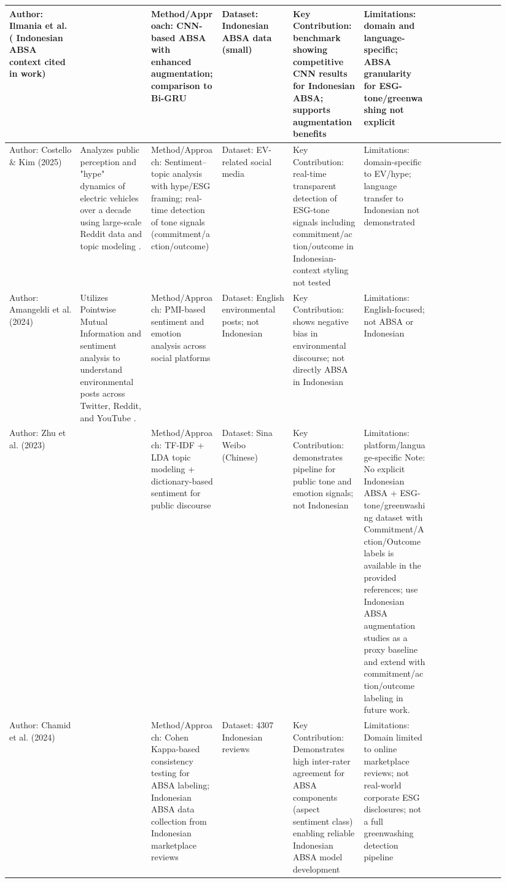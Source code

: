 \documentclass{article}
\begin{document}
\begin{landscape}
\begin{longtable}{p{0.134\linewidth} p{0.134\linewidth} p{0.134\linewidth} p{0.134\linewidth} p{0.134\linewidth} p{0.134\linewidth} p{0.134\linewidth}}
Author: Ilmania et al. ( Indonesian ABSA context cited in work) & ~ & Method/Approach: CNN-based ABSA with enhanced augmentation; comparison to Bi-GRU & Dataset: Indonesian ABSA data (small) & Key Contribution: benchmark showing competitive CNN results for Indonesian ABSA; supports augmentation benefits & Limitations: domain and language-specific; ABSA granularity for ESG-tone/greenwashing not explicit & ~ \\ \hline
Author: Costello \& Kim (2025) & Analyzes public perception and "hype" dynamics of electric vehicles over a decade using large-scale Reddit data and topic modeling  \parencite{tao_ruan_824a9480}. & Method/Approach: Sentiment–topic analysis with hype/ESG framing; real-time detection of tone signals (commitment/action/outcome) & Dataset: EV-related social media & Key Contribution: real-time transparent detection of ESG-tone signals including commitment/action/outcome in Indonesian-context styling not tested & Limitations: domain-specific to EV/hype; language transfer to Indonesian not demonstrated & ~ \\ \hline
Author: Amangeldi et al. (2024) & Utilizes Pointwise Mutual Information and sentiment analysis to understand environmental posts across Twitter, Reddit, and YouTube  \parencite{daniyar_amangeldi_dfc2f315}. & Method/Approach: PMI-based sentiment and emotion analysis across social platforms & Dataset: English environmental posts; not Indonesian & Key Contribution: shows negative bias in environmental discourse; not directly ABSA in Indonesian & Limitations: English-focused; not ABSA or Indonesian & ~ \\ \hline
Author: Zhu et al. (2023) & ~ & Method/Approach: TF-IDF + LDA topic modeling + dictionary-based sentiment for public discourse & Dataset: Sina Weibo (Chinese) & Key Contribution: demonstrates pipeline for public tone and emotion signals; not Indonesian & Limitations: platform/language-specific Note: No explicit Indonesian ABSA + ESG-tone/greenwashing dataset with Commitment/Action/Outcome labels is available in the provided references; use Indonesian ABSA augmentation studies as a proxy baseline and extend with commitment/action/outcome labeling in future work. & ~ \\ \hline
Author: Chamid et al. (2024) & ~ & Method/Approach: Cohen Kappa-based consistency testing for ABSA labeling; Indonesian ABSA data collection from Indonesian marketplace reviews & Dataset: 4307 Indonesian reviews & Key Contribution: Demonstrates high inter-rater agreement for ABSA components (aspect sentiment class) enabling reliable Indonesian ABSA model development & Limitations: Domain limited to online marketplace reviews; not real-world corporate ESG disclosures; not a full greenwashing detection pipeline & ~ \\ \hline

\end{longtable}
\end{landscape}
\end{document}
